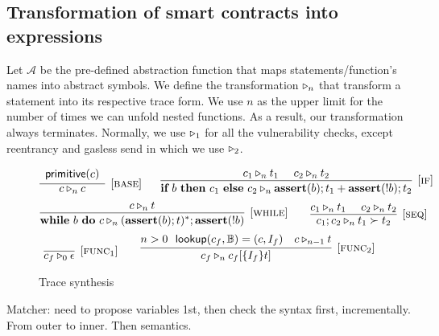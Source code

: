 \subsection{Transformation of smart contracts into expressions}

Let $\mathcal{A}$ be the pre-defined abstraction function that maps statements/function's names into abstract symbols. We define the transformation $\triangleright_n$ that transform a statement into its respective trace form. We use $n$ as the upper limit for the number of times we can unfold nested functions. As a result, our transformation always terminates. Normally, we use $\triangleright_1$ for all the vulnerability checks, except reentrancy and gasless send in which we use $\triangleright_2$.
\begin{figure}
$$
\infer[{[\rname{base}]}]{c \trans_{n} c}{
	\begin{array}{c}
	\textsf{primitive}(c)
	\end{array}}
~~~~~
\infer[{[\rname{if}]}]{\ifs{b}{c_1}{c_2} \trans_{n} \textbf{assert}(b);t_1+\textbf{assert}(!b);t_2}{c_1 \trans_{n} t_1~~~~ c_2 \trans_{n} t_2}
$$
$$
\infer[{[\rname{while}]}]{\whiles{b}{c} \trans_{n} (\textbf{assert}(b);t)^*;\textbf{assert}(!b)}{c \trans_{n} t}
~~~~~~
\infer[{[\rname{seq}]}]{c_1;c_2 \trans_{n} t_1 \nxt t_2}{c_1 \trans_{n} t_1~~~~ c_2 \trans_{n} t_2}
$$
$$
\infer[{[\rname{func}_1]}]{c_f \trans_{0} \epsilon}{}
~~~~~~
\infer[{[\rname{func}_2]}]{c_f \trans_{n} c_f[\{I_f\}t]}{n > 0~~\textsf{lookup}(c_f,\chain) = (c,I_f)~~~c \trans_{n-1} t}
$$
\caption{Trace synthesis}\label{fig:syn}
\end{figure}



Matcher: need to propose variables 1st, then check the syntax first, incrementally. From outer to inner. Then semantics.
